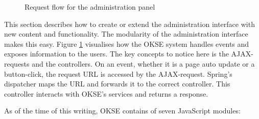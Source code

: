 \begin{center}
  \begin{figure}[ht!]
    \caption{Request flow for the administration panel}
    \label{fig:oac-request-flow}
  \end{figure}
\end{center}

This section describes how to create or extend the administration interface with new content and functionality. The modularity of the administration interface makes this easy. Figure \ref{fig:oac-request-flow} visualises how the OKSE system handles events and exposes information to the users. The key concepts to notice here is the AJAX-requests and the controllers. On an event, whether it is a page auto update or a button-click, the request URL is accessed by the AJAX-request. Spring's dispatcher maps the URL and forwards it to the correct controller. This controller interacts with OKSE's services and returns a response.

As of the time of this writing, OKSE contains of seven JavaScript modules: 

